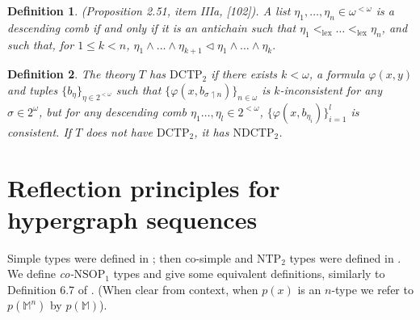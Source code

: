 \documentclass[12pt]{amsart}
\newtheorem{definition}{Definition}[section]
\theoremstyle{definition}
\begin{document}
\begin{definition}\label{4-descendingcomb}(Proposition 2.51, item IIIa, [102]). A list $\eta_{1}, \ldots, \eta_{n} \in \omega^{<\omega}$ is a \emph{descending comb} if and only if it is an antichain such that $\eta_{1} <_{\mathrm{lex}} \ldots <_{\mathrm{lex}} \eta_{n}$, and such that, for $1 \leq k < n$,  $\eta_{1} \wedge \ldots \wedge \eta_{k+1} \lhd \eta_{1} \wedge \ldots \wedge \eta_{k}.$
    
\end{definition}


\begin{definition}
The theory $T$ has \emph{$\mathrm{DCTP}_{2}$} if there exists $k < \omega$, a formula $\varphi(x, y)$ and tuples $\{b_{\eta}\}_{\eta \in 2^{<\omega}}$ such that $\{\varphi(x, b_{\sigma \upharpoonleft n})\}_{n \in \omega}$ is $k$-inconsistent for any $\sigma \in 2^{\omega}$, but for any descending comb $\eta_{1} \ldots, \eta_{l} \in 2^{< \omega}$, $\{\varphi(x, b_{\eta_{i}})\}_{i=1}^{l}$ is consistent. If $T$ does not have $\mathrm{DCTP}_{2}$, it has \emph{$\mathrm{NDCTP}_{2}$}.
\end{definition}

\section{Reflection principles for hypergraph sequences}

Simple types were defined in \cite{HKP00}; then co-simple and $\mathrm{NTP}_{2}$ types were defined in \cite{Che14}. We define \textit{co-$\mathrm{NSOP}_{1}$} types and give some equivalent definitions, similarly to Definition 6.7 of \cite{Che14}. (When clear from context, when $p(x)$ is an $n$-type we refer to $p(\mathbb{M}^{n})$ by $p(\mathbb{M})$).
\end{document}
